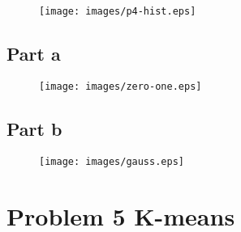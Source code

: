 \documentclass{report}
\begin{document}
\begin{figure}
\centering
  \texttt{[image: images/p4-hist.eps]}
  \label{fig:p4-hist}
\end{figure}

\subsection*{Part a}

\begin{figure}
\centering
  \texttt{[image: images/zero-one.eps]}
  \label{fig:zero-one-parzen}
\end{figure}

\subsection*{Part b}
\begin{figure}
\centering
  \texttt{[image: images/gauss.eps]}
  \label{fig:gauss-parzen}
\end{figure}

\section*{Problem 5 K-means}
\end{document}
